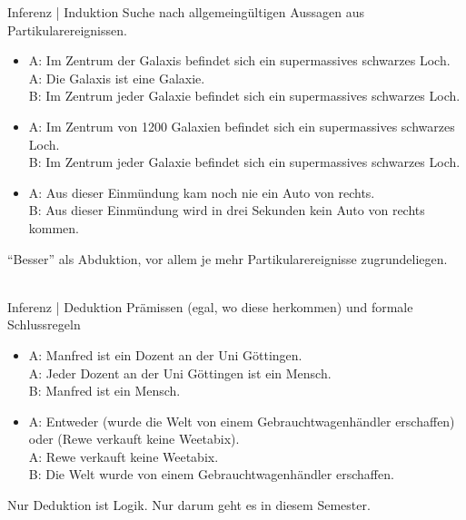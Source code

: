 \begin{frame}
  {Inferenz | Induktion}
  \onslide<+->
  \onslide<+->
  Suche nach \alert{allgemeingültigen Aussagen} aus Partikularereignissen.\\
  \Halbzeile
  \begin{itemize}[<+->]
    \item A: Im Zentrum der Galaxis befindet sich ein supermassives schwarzes Loch.\\
          A: Die Galaxis ist eine Galaxie.\\
          B: Im Zentrum jeder Galaxie befindet sich ein supermassives schwarzes Loch.
    \item A: Im Zentrum von 1200 Galaxien befindet sich ein supermassives schwarzes Loch.\\
          B: Im Zentrum jeder Galaxie befindet sich ein supermassives schwarzes Loch.
    \item A: Aus dieser Einmündung kam noch nie ein Auto von rechts.\\
          B: Aus dieser Einmündung wird in drei Sekunden kein Auto von rechts kommen.
  \end{itemize}
  \onslide<+->
  \Zeile 
  \centering 
  \alert{"`Besser"' als Abduktion, vor allem je mehr Partikularereignisse zugrundeliegen.}\\
  \\
\end{frame}

\begin{frame}
  {Inferenz | Deduktion}
  \onslide<+->
  \onslide<+->
  \alert{Prämissen} (egal, wo diese herkommen) und formale \alert{Schlussregeln}\\
  \Halbzeile
  \begin{itemize}[<+->]
    \item A: Manfred ist ein Dozent an der Uni Göttingen.\\
      A: Jeder Dozent an der Uni Göttingen ist ein Mensch.\\
      B: Manfred ist ein Mensch.
    \item A: Entweder (wurde die Welt von einem Gebrauchtwagenhändler erschaffen) oder (Rewe verkauft keine Weetabix).\\
      A: Rewe verkauft keine Weetabix.\\
      B: Die Welt wurde von einem Gebrauchtwagenhändler erschaffen.
  \end{itemize}
  \onslide<+->
  \Zeile
  \centering 
  \alert{Nur Deduktion ist Logik. Nur darum geht es in diesem Semester.}
\end{frame}

